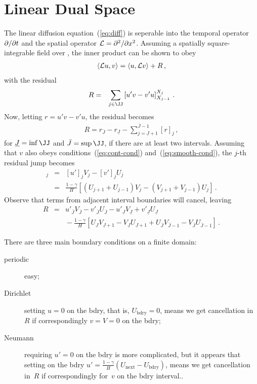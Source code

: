 \documentclass[12pt,a5paper]{article}
\newcommand{\ajr}[1]{%
  \pdfcomment[author=AJR,color={1 1 0},subject={#1}]{#1}}
\begin{document}
\section{Linear Dual Space}
The linear diffusion equation~(\ref{eq:diff}) is seperable into the temporal operator $\D {t}{}$ and the spatial operator
${\cal L}=\DD {x}{}$. Assuming a spatially square-integrable field over \XX, the inner product can be shown to obey
\begin{eqnarray}
\langle{\cal L}u,v\rangle =
\langle u,{\cal L}v\rangle + R\,,
\end{eqnarray}
with the residual 
\begin{eqnarray}
R &= & \sum_{j\in\JJ}\left[u'v-v'u\right]_{X_{j-1}}^{X_j}\,.
\end{eqnarray}
Now, letting $r=u'v-v'u$, the residual becomes 
\begin{eqnarray}
R = r_{\bar{J}}-r_{\underline{J}}-\sum_{j=\underline{J}+1}^{\bar{J}-1}[r]_j\,,
\end{eqnarray}
for $\underline{J}=\inf{\JJ}$ and $\bar{J}=\sup{\JJ}$,
if there are at least two intervals.
Assuming that $v$ also obeys conditions~(\ref{eq:cont-cond}) and~(\ref{eq:smooth-cond}), the $j$-th residual jump becomes
\begin{eqnarray}
[r]_j & = & [u']_j V_j-[v']_j U_j
\nonumber\\
& = & \frac{1-\gamma}{H}\left[
(U_{j+1}+U_{j-1})V_j-(V_{j+1}+V_{j-1})U_j
\right]\,.
\end{eqnarray}
Observe that terms from adjacent interval boundaries will cancel, leaving
\begin{eqnarray}
R & = & 
u'_{\bar{J}}V_{\bar{J}}-v'_{\bar{J}}U_{\bar{J}}
-u'_{\underline{J}}V_{\underline{J}}+v'_{\underline{J}}U_{\underline{J}}
\nonumber\\ &&
{}-\frac{1-\gamma}{H}\left[
U_{\underline{J}}V_{\underline{J}+1}-V_{\underline{J}}U_{\underline{J}+1}
+U_{\bar{J}}V_{\bar{J}-1}-V_{\bar{J}}U_{\bar{J}-1}
\right]\,.
\end{eqnarray}

\quad\ajr{Check the following.}
There are three main boundary conditions on a finite domain:
\begin{description}
\item[periodic] easy;
\item[Dirichlet] setting \(u=0\) on the bdry, that is, \(U_{\text{bdry}}=0\), means we get cancellation in~\(R\) if correspondingly \(v=V=0\) on the bdry;
\item[Neumann] requiring \(u'=0\) on the bdry is more complicated, but it appears that setting on the bdry \(u'=\frac{1-\gamma}H(U_{\text{next}}-U_{\text{bdry}})\), means we get cancellation in~\(R\) if correspondingly for~\(v\) on the bdry interval..
\end{description}
\end{document}
